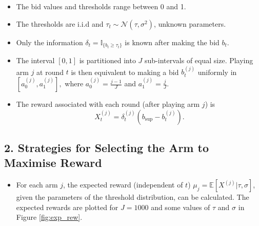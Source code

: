 \documentclass[
	landscape, %
]{ImperialPoster}
\begin{document}
\begin{multicols}{4}
\begin{itemize}
		\item The bid values and thresholds range between 0 and 1.
		\item The thresholds are i.i.d and $\tau_t \sim \mathcal{N}(\tau, \sigma^2)$, unknown parameters.
		\item Only the information $\delta_{t} = \mathbb{I}_{\{b_{t} \geq \tau_{t}\}}$ is known after making the bid $b_t$.
		\item The interval $[0,1]$ is \textcolor{ICLBlue}{partitioned} into $J$ sub-intervals of equal size. Playing \textcolor{ICLBlue}{arm} $j$ at round $t$ is then equivalent to making a bid 
		$b_t^{(j)}$ uniformly in $\left[a_0^{(j)}, a_1^{(j)}\right],$ where $a_0^{(j)} = \frac{j-1}{J}$ and $a_1^{(j)} = \frac{j}{J}$.
		\item The \textcolor{ICLBlue}{reward} associated with each round (after playing arm $j$) is
		$$X_t^{(j)} = \delta_t^{(j)} (b_{\sup} - b_t^{(j)}).$$
	\end{itemize}
    \subsection{2. Strategies for Selecting the Arm to Maximise Reward}
	
	\begin{itemize}
		\item For each arm $j$, the \textcolor{ICLBlue}{expected reward} (independent of $t$) $\mu_j = \mathbb{E}\left[X^{(j)}|\tau, \sigma\right]$, given the parameters of the threshold distribution, can be calculated. The expected rewards are plotted for 
		$J = 1000$ and some values of $\tau$ and $\sigma$ in Figure \ref{fig:exp_rew}.
	\end{itemize}


\end{multicols}
\end{document}
